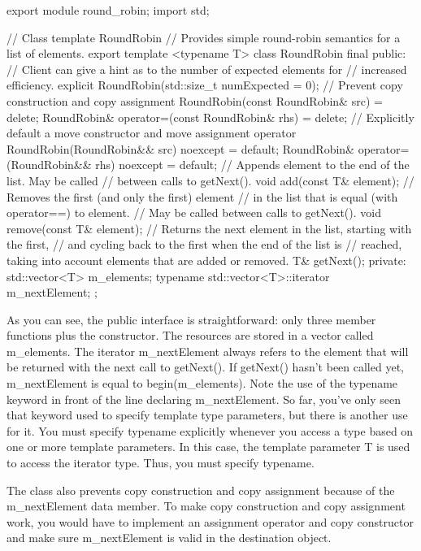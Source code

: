 \begin{cpp}
export module round_robin;
import std;

// Class template RoundRobin
// Provides simple round-robin semantics for a list of elements.
export template <typename T>
class RoundRobin final
{
    public:
        // Client can give a hint as to the number of expected elements for
        // increased efficiency.
        explicit RoundRobin(std::size_t numExpected = 0);
        // Prevent copy construction and copy assignment
        RoundRobin(const RoundRobin& src) = delete;
        RoundRobin& operator=(const RoundRobin& rhs) = delete;
        // Explicitly default a move constructor and move assignment operator
        RoundRobin(RoundRobin&& src) noexcept = default;
        RoundRobin& operator=(RoundRobin&& rhs) noexcept = default;
        // Appends element to the end of the list. May be called
        // between calls to getNext().
        void add(const T& element);
        // Removes the first (and only the first) element
        // in the list that is equal (with operator==) to element.
        // May be called between calls to getNext().
        void remove(const T& element);
        // Returns the next element in the list, starting with the first,
        // and cycling back to the first when the end of the list is
        // reached, taking into account elements that are added or removed.
        T& getNext();
    private:
        std::vector<T> m_elements;
        typename std::vector<T>::iterator m_nextElement;
};
\end{cpp}

As you can see, the public interface is straightforward: only three member functions plus the constructor. The resources are stored in a vector called m\_elements. The iterator m\_nextElement always refers to the element that will be returned with the next call to getNext(). If getNext() hasn’t been called yet, m\_nextElement is equal to begin(m\_elements). Note the use of the typename keyword in front of the line declaring m\_nextElement. So far, you’ve only seen that keyword used to specify template type parameters, but there is another use for it. You must specify typename explicitly whenever you access a type based on one or more template parameters. In this case, the template parameter T is used to access the iterator type. Thus, you must specify typename.

The class also prevents copy construction and copy assignment because of the m\_nextElement data member. To make copy construction and copy assignment work, you would have to implement an assignment operator and copy constructor and make sure m\_nextElement is valid in the destination object.

